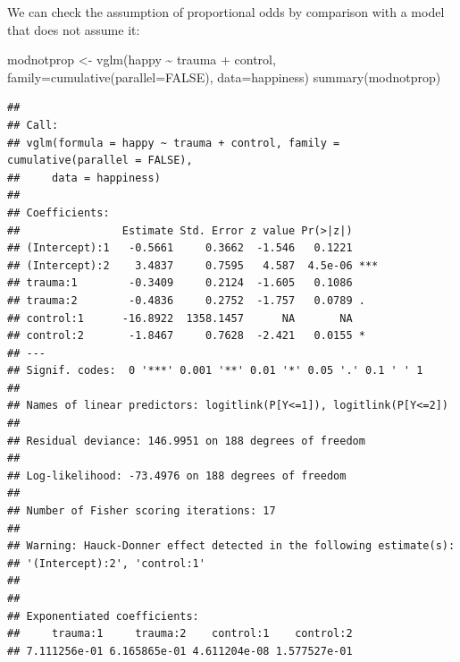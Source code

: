 \documentclass[
  ignorenonframetext,
]{beamer}
\newenvironment{Shaded}{\begin{snugshade}}{\end{snugshade}}
\newcommand{\AttributeTok}[1]{\textcolor[rgb]{0.77,0.63,0.00}{#1}}
\newcommand{\ConstantTok}[1]{\textcolor[rgb]{0.00,0.00,0.00}{#1}}
\newcommand{\FunctionTok}[1]{\textcolor[rgb]{0.00,0.00,0.00}{#1}}
\newcommand{\NormalTok}[1]{#1}
\newcommand{\OtherTok}[1]{\textcolor[rgb]{0.56,0.35,0.01}{#1}}
\newcommand{\SpecialCharTok}[1]{\textcolor[rgb]{0.00,0.00,0.00}{#1}}
\begin{document}
\begin{frame}[fragile]{}
\protect\hypertarget{section-8}{}
We can check the assumption of proportional odds by comparison with a
model that does not assume it:

\vspace{12pt}
\tiny

\begin{Shaded}
\begin{Highlighting}[]
\NormalTok{modnotprop }\OtherTok{\textless{}{-}} \FunctionTok{vglm}\NormalTok{(happy }\SpecialCharTok{\textasciitilde{}}\NormalTok{ trauma }\SpecialCharTok{+}\NormalTok{ control, }\AttributeTok{family=}\FunctionTok{cumulative}\NormalTok{(}\AttributeTok{parallel=}\ConstantTok{FALSE}\NormalTok{),}
                   \AttributeTok{data=}\NormalTok{happiness)}
\FunctionTok{summary}\NormalTok{(modnotprop)}
\end{Highlighting}
\end{Shaded}

\begin{verbatim}
## 
## Call:
## vglm(formula = happy ~ trauma + control, family = cumulative(parallel = FALSE), 
##     data = happiness)
## 
## Coefficients: 
##                Estimate Std. Error z value Pr(>|z|)    
## (Intercept):1   -0.5661     0.3662  -1.546   0.1221    
## (Intercept):2    3.4837     0.7595   4.587  4.5e-06 ***
## trauma:1        -0.3409     0.2124  -1.605   0.1086    
## trauma:2        -0.4836     0.2752  -1.757   0.0789 .  
## control:1      -16.8922  1358.1457      NA       NA    
## control:2       -1.8467     0.7628  -2.421   0.0155 *  
## ---
## Signif. codes:  0 '***' 0.001 '**' 0.01 '*' 0.05 '.' 0.1 ' ' 1
## 
## Names of linear predictors: logitlink(P[Y<=1]), logitlink(P[Y<=2])
## 
## Residual deviance: 146.9951 on 188 degrees of freedom
## 
## Log-likelihood: -73.4976 on 188 degrees of freedom
## 
## Number of Fisher scoring iterations: 17 
## 
## Warning: Hauck-Donner effect detected in the following estimate(s):
## '(Intercept):2', 'control:1'
## 
## 
## Exponentiated coefficients:
##     trauma:1     trauma:2    control:1    control:2 
## 7.111256e-01 6.165865e-01 4.611204e-08 1.577527e-01
\end{verbatim}
\end{frame}
\end{document}
